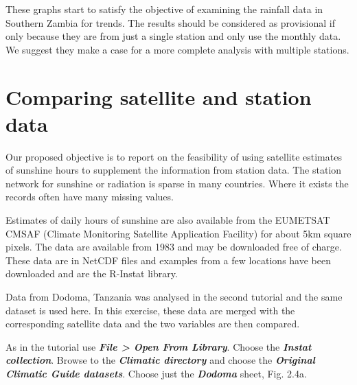 \documentclass[
  letterpaper,
  DIV=11,
  numbers=noendperiod]{scrreprt}
\begin{document}
These graphs start to satisfy the objective of examining the rainfall
data in Southern Zambia for trends. The results should be considered as
provisional if only because they are from just a single station and only
use the monthly data. We suggest they make a case for a more complete
analysis with multiple stations.

\section{Comparing satellite and station
data}\label{comparing-satellite-and-station-data}

Our proposed objective is to report on the feasibility of using
satellite estimates of sunshine hours to supplement the information from
station data. The station network for sunshine or radiation is sparse in
many countries. Where it exists the records often have many missing
values.

Estimates of daily hours of sunshine are also available from the
EUMETSAT CMSAF (Climate Monitoring Satellite Application Facility) for
about 5km square pixels. The data are available from 1983 and may be
downloaded free of charge. These data are in NetCDF files and examples
from a few locations have been downloaded and are the R-Instat library.

Data from Dodoma, Tanzania was analysed in the second tutorial and the
same dataset is used here. In this exercise, these data are merged with
the corresponding satellite data and the two variables are then
compared.

As in the tutorial use \textbf{\emph{File \textgreater{} Open From
Library}}. Choose the \textbf{\emph{Instat collection}}. Browse to the
\textbf{\emph{Climatic directory}} and choose the \textbf{\emph{Original
Climatic Guide datasets}}. Choose just the \textbf{\emph{Dodoma}} sheet,
Fig. 2.4a.
\end{document}
